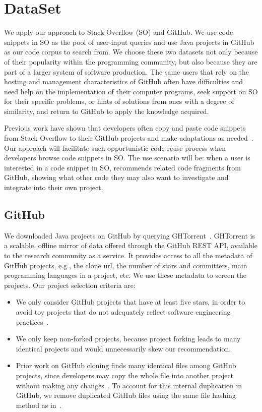 \section{DataSet}
\label{sec:dataset}
We apply our approach to Stack Overflow (SO) and GitHub. We use code snippets in SO as the pool of user-input queries and use Java projects in GitHub as our code corpus to search from. We choose these two datasets not only because of their popularity within the programming community, but also because they are part of a larger system of software production. The same users that rely on the hosting and management characteristics of GitHub often have difficulties and need help on the implementation of their computer programs, seek support on SO for their specific problems, or hints of solutions from ones with a degree of similarity, and return to GitHub to apply the knowledge acquired. 

Previous work have shown that developers often copy and paste code snippets from Stack Overflow to their GitHub projects and make adaptations as needed~\cite{yang2017stack, an2017stack, wu2018developers, zhang2019analyzing}. Our approach will facilitate such opportunistic code reuse process when developers browse code snippets in SO. The use scenario will be: when a user is interested in a code snippet in SO, {\tool} recommends related code fragments from GitHub, showing what other code they may also want to investigate and integrate into their own project. 


\subsection{GitHub}
We downloaded Java projects on GitHub by querying GHTorrent~\cite{gousios2012ghtorrent}. GHTorrent is a scalable, offline mirror of data offered through the GitHub REST API, available to the research community as a service. It provides access to all the metadata of GitHub projects, e.g., the clone url, the number of stars and committers, main programming languages in a project, etc. We use these metadata to screen the projects. Our project selection criteria are:
\begin{itemize}
	\item We only consider GitHub projects that have at least five stars, in order to avoid toy projects that do not adequately reflect software engineering practices~\cite{kalliamvakou2014promises}.
	\item We only keep non-forked projects, because project forking leads to many identical projects and would unnecessarily skew our recommendation.
	\item Prior work on GitHub cloning finds many identical files among GitHub projects, since developers may copy the whole file into another project without making any changes~\cite{lopes2017dejavu}. To account for this internal duplication in GitHub, we remove duplicated GitHub files using the same file hashing method as in~\cite{lopes2017dejavu}.
\end{itemize} 

